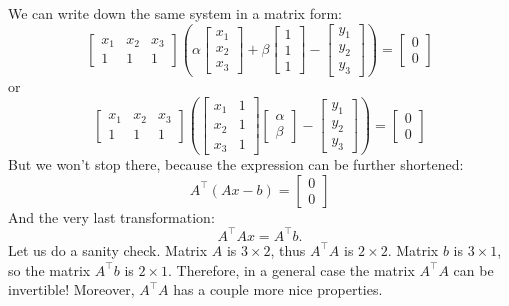 \documentclass[notitlepage]{report}
\begin{document}
We can write down the same system in a matrix form:
$$
\begin{bmatrix}x_1 & x_2 & x_3 \\ 1 & 1 & 1 \end{bmatrix}
\left(\alpha \begin{bmatrix}x_1  \\ x_2 \\x_3  \end{bmatrix}
+\beta \begin{bmatrix}1 \\ 1 \\1 \end{bmatrix} - 
\begin{bmatrix}y_1\\y_2\\y_3\end{bmatrix}\right) = \begin{bmatrix}0\\0\end{bmatrix}
$$
or
$$
\begin{bmatrix}x_1 & x_2 & x_3 \\ 1 & 1 & 1 \end{bmatrix}
\left(
\begin{bmatrix}x_1  & 1 \\ x_2 & 1 \\x_3 & 1 \end{bmatrix}
\begin{bmatrix} \alpha \\ \beta \end{bmatrix}-
\begin{bmatrix} y_1 \\ y_2 \\ y_3 \end{bmatrix}
\right) = \begin{bmatrix}0\\0\end{bmatrix}
$$
But we won't stop there, because the expression can be further shortened:
$$
A^\top (Ax - b)= \begin{bmatrix}0\\0\end{bmatrix}
$$
And the very last transformation:
$$
A^\top Ax = A^\top b.
$$
Let us do a sanity check. Matrix $A$ is $3\times 2$, thus  $A^\top A$ is $2\times 2$. Matrix $b$ is $3\times 1$, so the matrix $A^\top b$ is $2\times 1$.
Therefore, in a general case the matrix $A^\top A$ can be invertible! Moreover, $A^\top A$ has a couple more nice properties.
\end{document}
